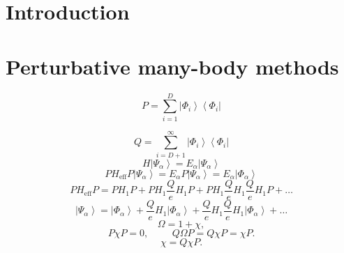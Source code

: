 

\newcommand{\bra}[1]{\left\langle #1 \right|}
\newcommand{\ket}[1]{\left| #1 \right\rangle}



\pagestyle{empty}


\section{Introduction}
\clearpage
\section{Perturbative many-body methods}
{\Large
\[
        P=\sum_{i=1}^{D} \left|\Phi_i\right\rangle
        \left\langle\Phi_i\right |
\]\vspace{1cm}

\[
        Q=\sum_{i=D+1}^{\infty} \left|\Phi_i\right\rangle
        \left\langle\Phi_i\right |
\]\vspace{1cm}
\[
                H\left|\Psi_{\alpha}\right\rangle= 
                E_{\alpha}\left|\Psi_{\alpha}\right\rangle
\]\vspace{1cm}
\[
               PH_{\mathrm{eff}}P\left|\Psi_{\alpha}\right\rangle=
               E_{\alpha}P\left|\Psi_{\alpha}\right\rangle=
              E_{\alpha}\left|\Phi_{\alpha}\right\rangle
\]\vspace{1cm}
\[
               PH_{\mathrm{eff}}P=PH_1P +PH_1\frac{Q}{e}H_1 P+
               PH_1\frac{Q}{e}H_1 \frac{Q}{e}H_1 P+\dots
               \label{eq:effint}
\]\vspace{1cm}
\[
                \left|\Psi_{\alpha}\right\rangle=
                \left|\Phi_{\alpha}\right\rangle+
                \frac{Q}{e}H_1\left|\Phi_{\alpha}\right\rangle
                +\frac{Q}{e}H_1\frac{Q}{e}H_1\left|\Phi_{\alpha}\right\rangle
                +\dots
                \label{eq:wavef}
\]
\clearpage
\[
              \Omega = 1 +\chi,
\]\vspace{1cm}
\[
               P\chi P = 0, \hspace{1cm} Q\Omega P = 
              Q\chi P =\chi P. \label{eq:chi1}
\]\vspace{1cm}
\[
                   \chi = Q\chi P. \label{eq:chi2}
\]\vspace{1cm}

}
